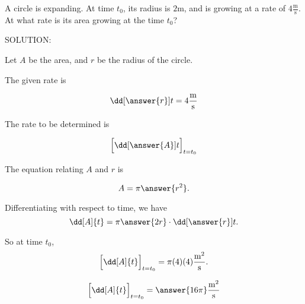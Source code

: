 \documentclass{ximera}
\author{Steven Gubkin\and Nela Lakos}
\begin{document}
\begin{exercise}

A circle is expanding.  At time $t_0$, its radius is $2 \textrm{m}$,
and is growing at a rate of $4 \frac{\textrm{m}}{\textrm{s}}$.  At
what rate is its area growing at the time $t_0$?

SOLUTION:  


  Let $A$ be the area, and $r$ be the radius of the circle. 
  
  The given rate is
  
   \[
\dd[\answer{r}]{t} =4\frac{\textrm{m}}{\textrm{s}}
  \]
  
  
  The rate to be determined is 
  
   \[
 \Bigl[\dd[\answer{A}]{t}\Bigr]_  {t=t_0} 
  \]
  
   The equation relating $A$ and $r$ is
  
  
  \[
  A = \pi \answer{r^2}.
  \]



  Differentiating with respect to time, we have
  \[
  \dd[A]{t} = \pi\answer{2 r }\cdot\dd[\answer{r}]{t}.
  \]


\begin{hint}
  So at time $t_0$,
  \[
  \Bigl[\dd[A]{t}\Bigr]_  {t=t_0} = \pi (4) (4) \frac{\textrm{m}^2}{\textrm{s}}.
  \]
\end{hint}

\begin{prompt}
  \[
 \Bigl[\dd[A]{t}\Bigr]_  {t=t_0}  = \answer{16\pi}\frac{\textrm{m}^2}{\textrm{s}}
  \]
\end{prompt}

\end{exercise}
\end{document}
